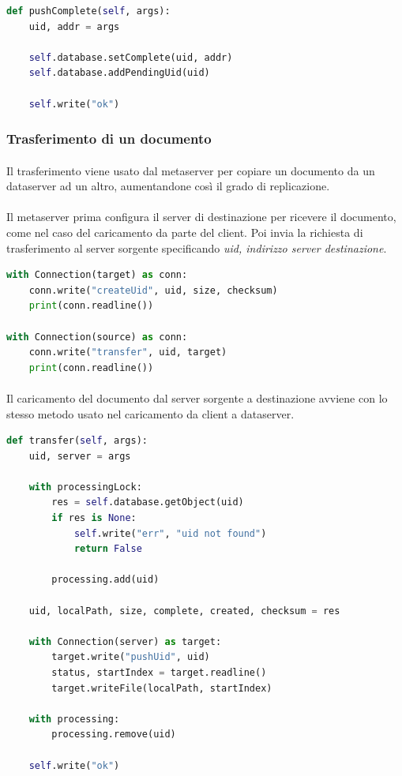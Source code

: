 \documentclass[11pt,a4paper,english]{article}
\begin{document}
\begin{lstlisting}[language=Python, title=Metaserver]
def pushComplete(self, args):
    uid, addr = args

    self.database.setComplete(uid, addr)
    self.database.addPendingUid(uid)

    self.write("ok")
\end{lstlisting}


\subsubsection{Trasferimento di un documento}

\paragraph{} Il trasferimento viene usato dal metaserver per copiare un documento da un dataserver ad un altro, aumentandone così il grado di replicazione.

\paragraph{} Il metaserver prima configura il server di destinazione per ricevere il documento, come nel caso del caricamento da parte del client. Poi invia la richiesta di trasferimento al server sorgente specificando \emph{uid, indirizzo server destinazione}.

\begin{lstlisting}[language=Python, title=Metaserver]
with Connection(target) as conn:
    conn.write("createUid", uid, size, checksum)
    print(conn.readline())

with Connection(source) as conn:
    conn.write("transfer", uid, target)
    print(conn.readline())
\end{lstlisting}

\paragraph{} Il caricamento del documento dal server sorgente a destinazione avviene con lo stesso metodo usato nel caricamento da client a dataserver.

\begin{lstlisting}[language=Python, title=Dataserver sorgente]
def transfer(self, args):
    uid, server = args

    with processingLock:
        res = self.database.getObject(uid)
        if res is None:
            self.write("err", "uid not found")
            return False

        processing.add(uid)

    uid, localPath, size, complete, created, checksum = res

    with Connection(server) as target:
        target.write("pushUid", uid)
        status, startIndex = target.readline()
        target.writeFile(localPath, startIndex)

    with processing:
        processing.remove(uid)

    self.write("ok")
\end{lstlisting}
\end{document}
